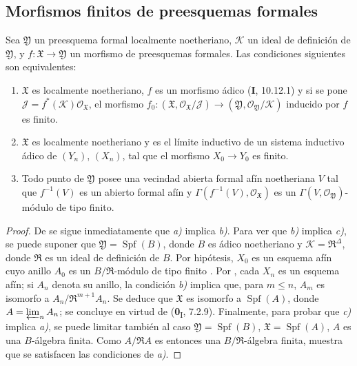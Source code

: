 \subsection{Morfismos finitos de preesquemas formales}

\begin{proposition}[4.8.1]
\label{III.4.8.1}
\label{III.4.8.1-fr}
Sea $\mathfrak Y$ un preesquema formal localmente noetheriano,
$\mathcal K$ un ideal de definición de $\mathfrak Y$, y
$f:\mathfrak X\to\mathfrak Y$ un morfismo de preesquemas formales.
Las condiciones siguientes son equivalentes:
\begin{enumerate}
  \item[\rm{a)}] $\mathfrak X$ es localmente noetheriano, $f$ es un morfismo ádico \textup{(\textbf{I}, 10.12.1)} y si se pone $\mathcal J=f^*(\mathcal K)\mathcal O_{\mathfrak X}$, el morfismo
    $f_0:(\mathfrak X,\mathcal O_{\mathfrak X}/\mathcal J)
  \longrightarrow
  (\mathfrak Y,\mathcal O_{\mathfrak Y}/\mathcal K)$
    inducido por $f$ es finito.
  \item[\rm{b)}] $\mathfrak X$ es localmente noetheriano y es el
    límite inductivo de un sistema inductivo ádico de $(Y_n)$, $(X_n)$,
    tal que el morfismo $X_0\to Y_0$ es finito.
  \item[\rm{c)}] Todo punto de $\mathfrak Y$ posee una vecindad abierta
    formal afín noetheriana $V$ tal que $f^{-1}(V)$ es
    un abierto formal afín y
    $\Gamma(f^{-1}(V),\mathcal O_{\mathfrak X})$ es un
    $\Gamma(V,\mathcal O_{\mathfrak Y})$-módulo de tipo finito.
\end{enumerate}
\end{proposition}

\begin{proof}
De  se sigue inmediatamente que \emph{a)} implica
\emph{b)}. Para ver que \emph{b)} implica \emph{c)}, se puede suponer
que
$\mathfrak Y=\operatorname{Spf}(B)$,
donde $B$ es ádico noetheriano y
$\mathcal K=\mathfrak R^\Delta$, donde $\mathfrak R$ es un ideal
de definición de $B$. Por hipótesis, $X_0$ es un esquema afín
cuyo anillo $A_0$ es un $B/\mathfrak R$-módulo de tipo finito
. Por , cada $X_n$ es un esquema
afín; si $A_n$ denota su anillo, la condición \emph{b)} implica que,
para $m\leq n$, $A_m$ es isomorfo a
$A_n/\mathfrak R^{m+1}A_n$. Se deduce que $\mathfrak X$ es isomorfo a
$\operatorname{Spf}(A)$, donde $A=\varprojlim_n A_n$; se concluye en virtud de
(\textbf{0}\textsubscript{I}, 7.2.9). Finalmente, para probar que \emph{c)}
implica \emph{a)}, se puede limitar también al caso
$\mathfrak Y=\operatorname{Spf}(B)$, $\mathfrak X=\operatorname{Spf}(A)$,
$A$ es una $B$-álgebra finita. Como
$A/\mathfrak RA$ es entonces una
$B/\mathfrak R$-álgebra finita,  muestra que se
satisfacen las condiciones de \emph{a)}.
\end{proof}

